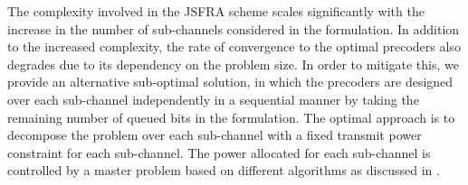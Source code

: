 
The complexity involved in the \ac{JSFRA} scheme scales significantly with the increase in the number of sub-channels considered in the formulation. In addition to the increased complexity, the rate of convergence to the optimal precoders also degrades due to its dependency on the problem size. In order to mitigate this, we provide an alternative sub-optimal solution, in which the precoders are designed over each sub-channel independently in a sequential manner by taking the remaining number of queued bits in the formulation. The optimal approach is to decompose the problem over each sub-channel with a fixed transmit power constraint for each sub-channel. The power allocated for each sub-channel is controlled by a master problem based on different algorithms as discussed in \cite{palomar2006tutorial,boyd2011distributed}.

